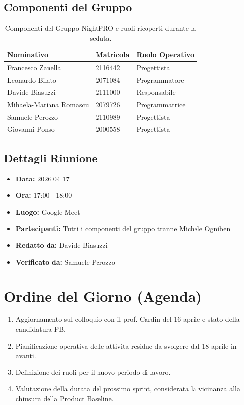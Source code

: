 \documentclass[a4paper, 11pt, oneside]{scrartcl}
\begin{document}
\subsection{Componenti del Gruppo}
\begin{table}[h!]
\centering
\begin{tabular}{@{}lll@{}}
\toprule
\textbf{Nominativo} & \textbf{Matricola} & \textbf{Ruolo Operativo} \\
\midrule
Francesco Zanella & 2116442 & Progettista \\
Leonardo Bilato & 2071084 & Programmatore \\
Davide Biasuzzi & 2111000 & Responsabile \\
Mihaela-Mariana Romascu & 2079726 & Programmatrice \\
Samuele Perozzo & 2110989 & Progettista \\
Giovanni Ponso & 2000558 & Progettista \\
\bottomrule
\end{tabular}
\caption{Componenti del Gruppo NightPRO e ruoli ricoperti durante la seduta.}
\end{table}

\subsection{Dettagli Riunione}
\begin{itemize}
	\item \textbf{Data:} 2026-04-17
	\item \textbf{Ora:} 17:00 - 18:00
	\item \textbf{Luogo:} Google Meet
	\item \textbf{Partecipanti:} Tutti i componenti del gruppo tranne Michele Ogniben
	\item \textbf{Redatto da:} Davide Biasuzzi
	\item \textbf{Verificato da:} Samuele Perozzo
\end{itemize}

\newpage
\section{Ordine del Giorno (Agenda)}
\begin{enumerate}
	\item Aggiornamento sul colloquio con il prof. Cardin del 16 aprile e stato della candidatura PB.
	\item Pianificazione operativa delle attivita residue da svolgere dal 18 aprile in avanti.
	\item Definizione dei ruoli per il nuovo periodo di lavoro.
	\item Valutazione della durata del prossimo sprint, considerata la vicinanza alla chiusura della Product Baseline.
\end{enumerate}
\end{document}
